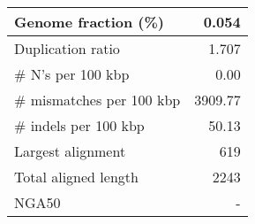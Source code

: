 \documentclass[12pt,a4paper]{article}
\begin{document}
\begin{table}[ht]
\begin{center}
\begin{tabular}{|l*{1}{|r}|}
Genome fraction (\%) & 0.054 \\ \hline
Duplication ratio & 1.707 \\ \hline
\# N's per 100 kbp & 0.00 \\ \hline
\# mismatches per 100 kbp & 3909.77 \\ \hline
\# indels per 100 kbp & 50.13 \\ \hline
Largest alignment & 619 \\ \hline
Total aligned length & 2243 \\ \hline
NGA50 & - \\ \hline
\end{tabular}
\end{center}
\end{table}
\end{document}
